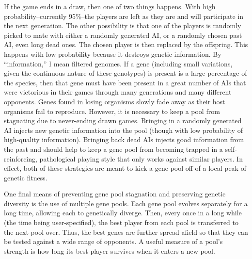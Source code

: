 \documentclass[letterpaper]{article}
\renewcommand\_{\textunderscore\allowbreak}
\begin{document}
If the game ends in  a draw, then one of two things happens. With high probability--currently 95\%--the players are left as they are and will participate in the next generation. The other possibility is that one of the players is randomly picked to mate with either a randomly generated AI, or a randomly chosen past AI, even long dead ones. The chosen player is then replaced by the offspring. This happens with low probability because it destroys genetic information. By ``information,'' I mean filtered genomes. If a gene (including small variations, given the continuous nature of these genotypes) is present is a large percentage of the species, then that gene must have been present in a great number of AIs that were victorious in their games through many generations and many different opponents. Genes found in losing organisms slowly fade away as their host organisms fail to reproduce. However, it is necessary to keep a pool from stagnating due to never-ending drawn games. Bringing in a randomly generated AI injects new genetic information into the pool (though with low probability of high-quality information). Bringing back dead AIs injects good information from the past and should help to keep a gene pool from becoming trapped in a self-reinforcing, pathological playing style that only works against similar players. In effect, both of these strategies are meant to kick a gene pool off of a local peak of genetic fitness.

One final means of preventing gene pool stagnation and preserving genetic diversity is the use of multiple gene pools. Each gene pool evolves separately for a long time, allowing each to genetically diverge. Then, every once in a long while (the time being user-specified), the best player from each pool is transferred to the next pool over. Thus, the best genes are further spread afield so that they can be tested against a wide range of opponents. A useful measure of a pool's strength is how long its best player survives when it enters a new pool.
\end{document}
